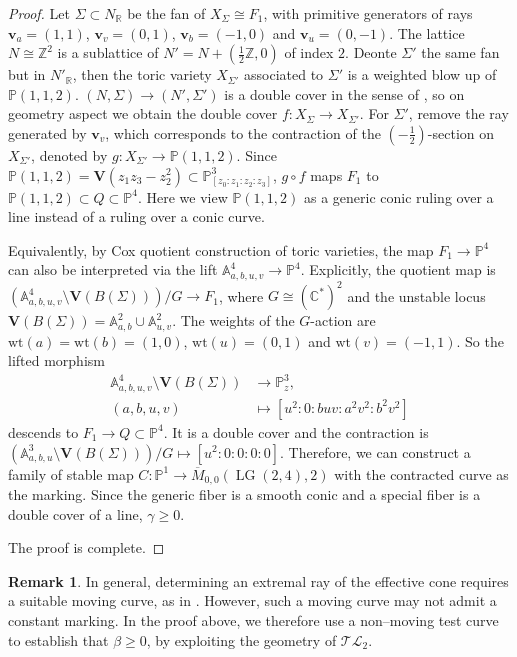 \documentclass[10pt]{amsart}
\theoremstyle{definition}
\newtheorem{remark}[theorem]{Remark}
\newcommand{\Mbar}{\overline{M}}
\newcommand{\LG}{\operatorname{LG}}
\newcommand{\TL}{\mathcal{TL}}
\newcommand{\PP}{\mathbb{P}}
\theoremstyle{plain} %
\begin{document}
\begin{proof}
Let $\Sigma\subset N_\mathbb{R}$ be the fan of $X_\Sigma\cong F_1$, with primitive generators of rays $\mathbf{v}_a=(1,1)$, $\mathbf{v}_v=(0,1)$, $\mathbf{v}_b=(-1,0)$ and $\mathbf{v}_u=(0,-1)$. The lattice $N\cong\mathbb{Z}^2$ is a sublattice of $N'=N+(\frac12\mathbb{Z},0)$ of index $2$. Deonte $\Sigma'$ the same fan but in $N'_\mathbb{R}$, then the toric variety $X_{\Sigma'}$ associated to $\Sigma'$ is a weighted blow up of $\mathbb{P}(1,1,2)$. $(N,\Sigma)\to(N',\Sigma')$ is a double cover in the sense of \cite[Definition~3.2]{AlexeevPardini2013ramified}, so on geometry aspect we obtain the double cover $f\colon X_{\Sigma}\to X_{\Sigma'}$. For $\Sigma'$, remove the ray generated by $\mathbf{v}_v$, which corresponds to the contraction of the $(-\frac12)$-section on $X_{\Sigma'}$, denoted by $g\colon X_{\Sigma'}\to\mathbb{P}(1,1,2)$. Since $\mathbb{P}(1,1,2)=\mathbf{V}(z_1z_3-z_2^2)\subset\mathbb{P}^3_{[z_0:z_1:z_2:z_3]}$, $g\circ f$ maps $F_1$ to $\mathbb{P}(1,1,2)\subset Q\subset\mathbb{P}^4$. Here we view $\mathbb{P}(1,1,2)$ as a generic conic ruling over a line instead of a ruling over a conic curve.

Equivalently, by Cox quotient construction of toric varieties, the map $F_1\to \mathbb{P}^4$ can also be interpreted via the lift $\mathbb{A}^4_{a,b,u,v}\to\mathbb{P}^4$. Explicitly, the quotient map is $(\mathbb{A}^4_{a,b,u,v}\setminus\mathbf{V}(B(\Sigma)))/G\to F_1$, where $G\cong(\mathbb{C}^*)^2$ and the unstable locus $\mathbf{V}(B(\Sigma))=\mathbb{A}_{a,b}^2\cup\mathbb{A}^2_{u,v}$. The weights of the $G$-action are $\mathrm{wt}(a)=\mathrm{wt}(b)=(1,0)$, $\mathrm{wt}(u)=(0,1)$ and $\mathrm{wt}(v)=(-1,1)$. So the lifted morphism
\begin{align*}
\mathbb{A}^4_{a,b,u,v}\setminus\mathbf{V}(B(\Sigma))&\to\mathbb{P}^3_z,\\
(a,b,u,v)&\mapsto[u^2:0:buv:a^2v^2:b^2v^2]
\end{align*}
descends to $F_1\to Q\subset\mathbb{P}^4$. It is a double cover and the contraction is $(\mathbb{A}^3_{a,b,u}\setminus\mathbf{V}(B(\Sigma)))/G\mapsto[u^2:0:0:0:0]$. Therefore, we can construct a family of stable map $C\colon\PP^1\rightarrow \Mbar_{0,0}(\LG(2,4),2)$ with the contracted curve as the marking. Since the generic fiber is a smooth conic and a special fiber is a double cover of a line,  $\gamma\geq 0$.

The proof is complete.
\end{proof}

\begin{remark}
In general, determining an extremal ray of the effective cone requires a suitable moving curve, as in \cite[Lemma 2.4]{CS06}. However, such a moving curve may not admit a constant marking. In the proof above, we therefore use a non--moving test curve to establish that $\beta \geq 0$, by exploiting the geometry of $\TL_2$.
\end{remark}
\end{document}
